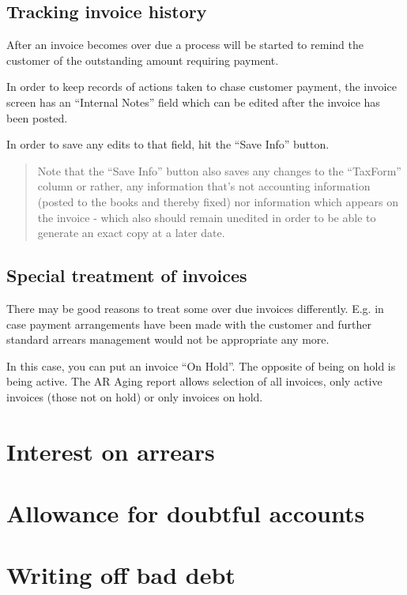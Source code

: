 \subsection{Tracking invoice history}

After an invoice becomes over due a process will be started to remind
the customer of the outstanding amount requiring payment.

In order to keep records of actions taken to chase customer payment,
the invoice screen has an ``Internal Notes'' field which can be edited
after the invoice has been posted.

In order to save any edits to that field, hit the ``Save Info'' button.

\begin{quotation}
Note that the ``Save Info'' button also saves any changes to the ``TaxForm'' column or
rather, any information that's not accounting information (posted to the books and
thereby fixed) nor information which appears on the invoice - which also should remain
unedited in order to be able to generate an exact copy at a later date.
\end{quotation}


\subsection{Special treatment of invoices}

There may be good reasons to treat some over due invoices differently. E.g. in case
payment arrangements have been made with the customer and further standard arrears
management would not be appropriate any more.

In this case, you can put an invoice ``On Hold''. The opposite of being on hold is
being active. The AR Aging report allows selection of all invoices, only active
invoices (those not on hold) or only invoices on hold.


\section{Interest on arrears}

\section{Allowance for doubtful accounts}



\section{Writing off bad debt}


